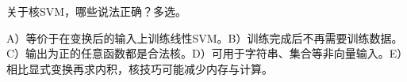 关于核SVM，哪些说法正确？多选。


A）等价于在变换后的输入上训练线性SVM。B）训练完成后不再需要训练数据。C）输出为正的任意函数都是合法核。D）可用于字符串、集合等非向量输入。E）相比显式变换再求内积，核技巧可能减少内存与计算。

